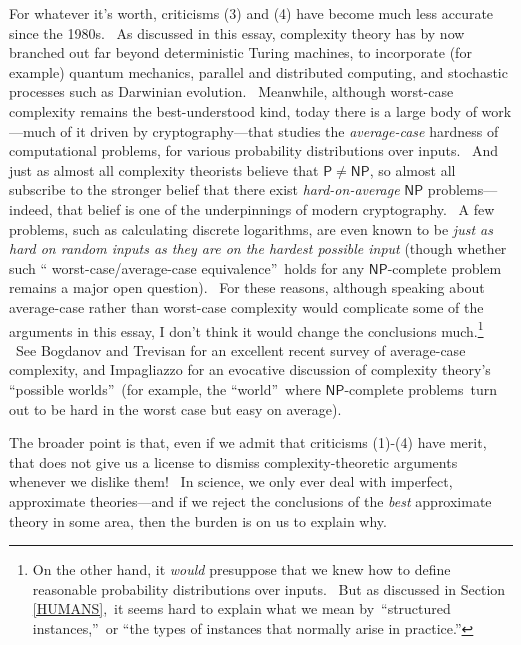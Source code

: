 \documentclass[11pt,onecolumn]{article}%
\begin{document}
For whatever it's worth, criticisms (3) and (4) have become much less accurate
since the 1980s. \ As discussed in this essay, complexity theory has by now
branched out far beyond deterministic Turing machines, to incorporate (for
example) quantum mechanics, parallel and distributed computing, and stochastic
processes such as Darwinian evolution. \ Meanwhile, although worst-case
complexity remains the best-understood kind, today there is a large body of
work---much of it driven by cryptography---that studies the
\textit{average-case} hardness of computational problems, for various
probability distributions over inputs. \ And just as almost all complexity
theorists believe that $\mathsf{P}\neq\mathsf{NP}$, so almost all subscribe to
the stronger belief that there exist \textit{hard-on-average} $\mathsf{NP}$
problems---indeed, that belief is one of the underpinnings of modern
cryptography. \ A few problems, such as calculating discrete logarithms, are
even known to be \textit{just as hard on random inputs as they are on the
hardest possible input} (though whether such \textquotedblleft
worst-case/average-case equivalence\textquotedblright\ holds for any
$\mathsf{NP}$-complete problem remains a major open question). \ For these
reasons, although speaking about average-case rather than worst-case
complexity would complicate some of the arguments in this essay, I don't think
it would change the conclusions much.\footnote{On the other hand, it
\textit{would} presuppose that we knew how to define reasonable probability
distributions over inputs. \ But as discussed in Section \ref{HUMANS},\ it
seems hard to explain what we mean by\ \textquotedblleft structured
instances,\textquotedblright\ or \textquotedblleft the types of instances that
normally arise in practice.\textquotedblright} \ See Bogdanov and Trevisan
\cite{bt} for an excellent recent survey of average-case complexity, and
Impagliazzo \cite{impagliazzo} for an evocative discussion of complexity
theory's \textquotedblleft possible worlds\textquotedblright\ (for example,
the \textquotedblleft world\textquotedblright\ where $\mathsf{NP}$-complete
problems\ turn out to be hard in the worst case but easy on average).

The broader point is that, even if we admit that criticisms (1)-(4) have
merit, that does not give us a license to dismiss complexity-theoretic
arguments whenever we dislike them! \ In science, we only ever deal with
imperfect, approximate theories---and if we reject the conclusions of the
\textit{best} approximate theory in some area, then the burden is on us to
explain why.
\end{document}
